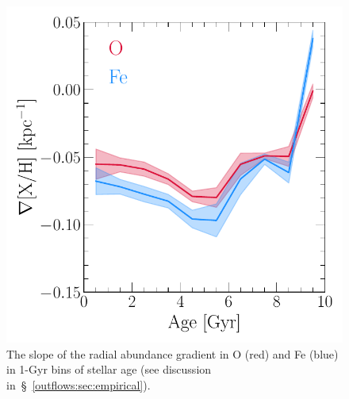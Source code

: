 

\begin{figure}
\centering
\includegraphics[scale = 0.6]{gradxh_vs_age.pdf}
\caption{
The slope of the radial abundance gradient in O (red) and Fe (blue) in 1-Gyr
bins of stellar age (see discussion
in~\S~\ref{outflows:sec:empirical}).
}
\label{outflows:fig:gradxh-vs-age}
\end{figure}

